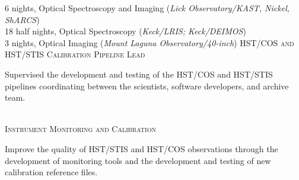 \documentclass[10pt]{cv}
\begin{document}
\begin{llist}
6 nights, Optical Spectroscopy and Imaging ({\it Lick Observatory/KAST, Nickel, ShARCS})\\
18 half nights, Optical Spectroscopy ({\it Keck/LRIS; Keck/DEIMOS})\\
3 nights, Optical Imaging ({\it Mount Laguna Observatory/40-inch})
%
\vspace{-0.1in}   
\textsc{HST/COS and HST/STIS Calibration Pipeline Lead}\\
\begin{minipage}[l]{0.7\textwidth}\vspace{0.15cm}
Supervised the development and testing of the HST/COS and HST/STIS pipelines coordinating between the scientists, software developers, and archive team. \\
\end{minipage}\vspace{0.15cm}
\\
\textsc{Instrument Monitoring and Calibration}\\
\begin{minipage}[l]{0.7\textwidth}\vspace{0.15cm}
Improve the quality of HST/STIS and HST/COS observations through the development of monitoring tools and the development and testing of new calibration reference files.\\
\end{minipage}\vspace{0.15cm}

\end{llist}
\end{document}
